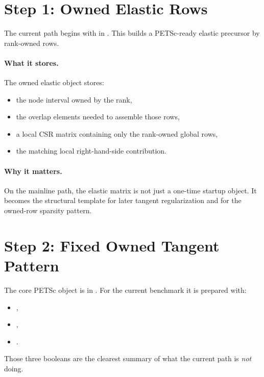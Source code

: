 \section{Step 1: Owned Elastic Rows}

The current path begins with
 in
. This builds a PETSc-ready elastic
precursor by rank-owned rows.

\paragraph{What it stores.}
The owned elastic object stores:
\begin{itemize}
\item the node interval owned by the rank,
\item the overlap elements needed to assemble those rows,
\item a local CSR matrix containing only the rank-owned global rows,
\item the matching local right-hand-side contribution.
\end{itemize}

\paragraph{Why it matters.}
On the mainline path, the elastic matrix is not just a one-time startup object.
It becomes the structural template for later tangent regularization and for the
owned-row sparsity pattern.

\section{Step 2: Fixed Owned Tangent Pattern}

The core PETSc object is  in
. For the current benchmark it is
prepared with:
\begin{itemize}
\item {},
\item {},
\item {}.
\end{itemize}

Those three booleans are the clearest summary of what the current path is
\emph{not} doing.


